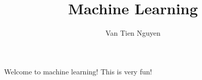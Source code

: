\documentclass{article}
\title{Machine Learning}
\author{Van Tien Nguyen}
\begin{document}
\maketitle
Welcome to machine learning!
This is very fun!
\end{document}

